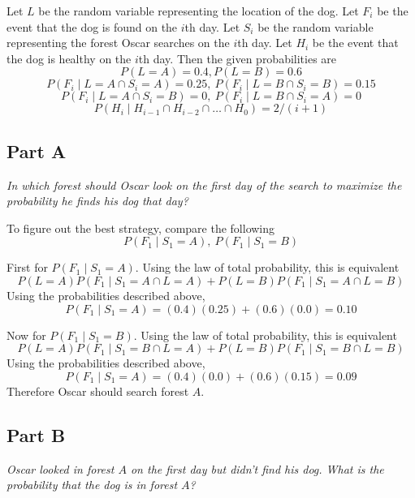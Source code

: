 \documentclass{article}
\begin{document}
\bigbreak

Let $ L $ be the random variable representing the location of the dog. Let $ F_i
$ be the event that the dog is found on the $ i $th day. Let $ S_i $ be the
random variable representing the forest Oscar searches on the $ i $th day. Let $
H_i $ be the event that the dog is healthy on the $ i $th day. Then the given
probabilities are
$$ P(L = A) = 0.4, P(L = B) = 0.6 $$
$$ P(F_i \mid L = A \cap S_i = A) = 0.25,\ P(F_i \mid L = B \cap S_i = B) = 0.15 $$
$$ P(F_i \mid L = A \cap S_i = B) = 0,\ P(F_i \mid L = B \cap S_i = A) = 0 $$
$$ P(H_i \mid H_{i - 1} \cap H_{i - 2} \cap \ldots \cap H_{0}) = 2 / (i + 1) $$

\subsection*{Part A}

\textit{ In which forest should Oscar look on the first day of the search to
maximize the probability he finds his dog that day?}

\bigbreak

To figure out the best strategy, compare the following
$$ P(F_1 \mid S_1 = A),\ P(F_1 \mid S_1 = B) $$

First for $ P(F_1 \mid S_1 = A) $. Using the law of total probability, this is
equivalent
$$ P(L = A) P(F_1 \mid S_1 = A \cap L = A) + P(L = B) P(F_1 \mid S_1 = A \cap L
= B) $$
Using the probabilities described above,
$$ P(F_1 \mid S_1 = A) = (0.4)(0.25) + (0.6)(0.0) = 0.10 $$

Now for $ P(F_1 \mid S_1 = B) $. Using the law of total probability, this is
equivalent
$$ P(L = A) P(F_1 \mid S_1 = B \cap L = A) + P(L = B) P(F_1 \mid S_1 = B \cap L
= B) $$
Using the probabilities described above,
$$ P(F_1 \mid S_1 = A) = (0.4)(0.0) + (0.6)(0.15) = 0.09 $$
Therefore Oscar should search forest $ A $.

\subsection*{Part B}

\textit{Oscar looked in forest $ A $ on the first day but didn’t find his dog.
What is the probability that the dog is in forest $ A $?}

\bigbreak
\end{document}
